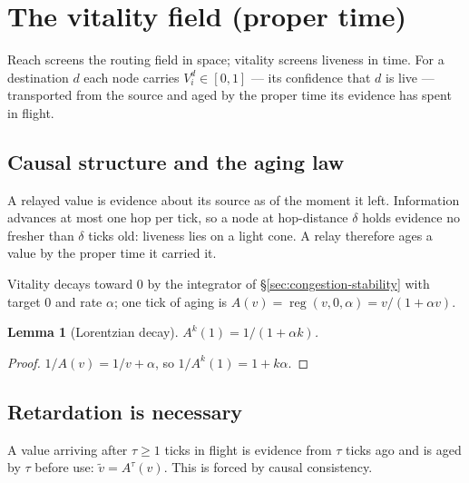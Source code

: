 \documentclass[11pt]{article}
\theoremstyle{plain}
\newtheorem{lemma}[theorem]{Lemma}
\numberwithin{equation}{section}
\begin{document}
\section{The vitality field (proper time)}\label{sec:vitality}

Reach screens the routing field in space; vitality screens liveness in time. For a destination $d$ each node carries $V^d_i\in[0,1]$ — its confidence that $d$ is live — transported from the source and aged by the proper time its evidence has spent in flight.

\subsection{Causal structure and the aging law}\label{sec:causal}

A relayed value is evidence about its source as of the moment it left. Information advances at most one hop per tick, so a node at hop-distance $\delta$ holds evidence no fresher than $\delta$ ticks old: liveness lies on a light cone. A relay therefore ages a value by the proper time it carried it.

Vitality decays toward $0$ by the integrator of §\ref{sec:congestion-stability} with target $0$ and rate $\alpha$; one tick of aging is $A(v)=\operatorname{reg}(v,0,\alpha)=v/(1+\alpha v)$.

\begin{lemma}[Lorentzian decay]\label{lem:lorentzian}
$A^{k}(1)=1/(1+\alpha k)$.
\end{lemma}
\begin{proof}
$1/A(v)=1/v+\alpha$, so $1/A^{k}(1)=1+k\alpha$.
\end{proof}

\subsection{Retardation is necessary}\label{sec:retardation}

A value arriving after $\tau\ge 1$ ticks in flight is evidence from $\tau$ ticks ago and is aged by $\tau$ before use: $\tilde v=A^{\tau}(v)$. This is forced by causal consistency.
\end{document}

